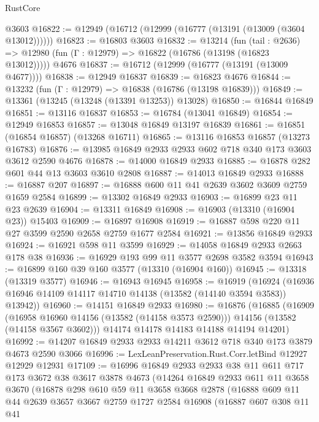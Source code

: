\begin{lexlean}{RustCore}
\begin{coremodule}
    @3603
@16822 := @12949 (@16712 (@12999 (@16777 (@13191 (@13009 (@3604 @13012))))))
@16823 := @16803 @3603
@16832 := @13214
    (fun (tail : @2636) => @12980 (fun (Γ : @12979) => @16822 (@16786 (@13198 (@16823 @13012)))))
    @4676
@16837 := @16712 (@12999 (@16777 (@13191 (@13009 @4677))))
@16838 := @12949 @16837
@16839 := @16823 @4676
@16844 := @13232 (fun (Γ : @12979) => @16838 (@16786 (@13198 @16839)))
@16849 := @13361 (@13245 (@13248 (@13391 @13253)) @13028)
@16850 := @16844 @16849
@16851 := @13116 @16837
@16853 := @16784 (@13041 @16849)
@16854 := @12949 @16853
@16857 := @13048 @16849 @13197 @16839
@16861 := @16851 (@16854 @16857) (@13268 @16711)
@16865 := @13116 @16853 @16857 (@13273 @16783)
@16876 := @13985 @16849 @2933 @2933 @602 @718 @340 @173 @3603 @3612 @2590 @4676
@16878 := @14000 @16849 @2933
@16885 := @16878 @282 @601 @44 @13 @3603 @3610 @2808
@16887 := @14013 @16849 @2933
@16888 := @16887 @207
@16897 := @16888 @600 @11 @41 @2639 @3602 @3609 @2759 @1659 @2584
@16899 := @13302 @16849 @2933
@16903 := @16899 @23 @11 @23 @2639
@16904 := @13311 @16849
@16908 := @16903 (@13310 (@16904 @23)) @15403
@16909 := @16897 @16908
@16919 := @16887 @598 @220 @11 @27 @3599 @2590 @2658 @2759 @1677 @2584
@16921 := @13856 @16849 @2933
@16924 := @16921 @598 @11 @3599
@16929 := @14058 @16849 @2933 @2663 @178 @38
@16936 := @16929 @193 @99 @11 @3577 @2698 @3582 @3594
@16943 := @16899 @160 @39 @160 @3577 (@13310 (@16904 @160))
@16945 := @13318 (@13319 @3577)
@16946 := @16943 @16945
@16958 := @16919
    (@16924 (@16936 @16946 @14109 @14117 @14710 @14138 (@13582 (@14140 @3594 @3583)) @13942))
@16960 := @14151 @16849 @2933
@16980 := @16876
    (@16885
      (@16909
        (@16958 @16960 @14156 (@13582 (@14158 @3573 @2590)))
        @14156
        (@13582 (@14158 @3567 @3602)))
      @14174
      @14178
      @14183
      @14188
      @14194
      @14201)
@16992 := @14207 @16849 @2933 @2933 @14211 @3612 @718 @340 @173 @3879 @4673 @2590 @3066
@16996 := LexLeanPreservation.Rust.Corr.letBind @12927 @12929 @12931
@17109 := @16996
    @16849
    @2933
    @2933
    @38
    @11
    @611
    @717
    @173
    @3672
    @38
    @3617
    @3878
    @4673
    (@14264
      @16849
      @2933
      @611
      @11
      @3658
      @3670
      (@16878
        @298
        @610
        @59
        @11
        @3658
        @3668
        @2878
        (@16888
          @609
          @11
          @44
          @2639
          @3657
          @3667
          @2759
          @1727
          @2584
          @16908
          (@16887
            @607
            @308
            @11
            @41

\end{coremodule}
\end{lexlean}

